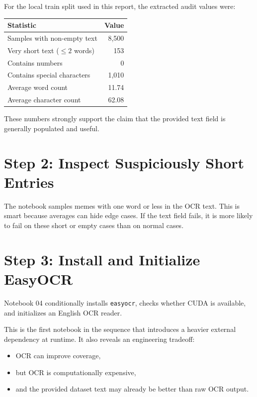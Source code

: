 \documentclass[11pt,a4paper]{report}
\begin{document}
For the local train split used in this report, the extracted audit values were:

\begin{center}
\begin{tabular}{lr}
\toprule
Statistic & Value \\
\midrule
Samples with non-empty text & 8,500 \\
Very short text ($\leq 2$ words) & 153 \\
Contains numbers & 0 \\
Contains special characters & 1,010 \\
Average word count & 11.74 \\
Average character count & 62.08 \\
\bottomrule
\end{tabular}
\end{center}

These numbers strongly support the claim that the provided text field is generally populated and useful.

\section{Step 2: Inspect Suspiciously Short Entries}

The notebook samples memes with one word or less in the OCR text. This is smart because averages can hide edge cases. If the text field fails, it is more likely to fail on these short or empty cases than on normal cases.

\section{Step 3: Install and Initialize EasyOCR}

Notebook 04 conditionally installs \texttt{easyocr}, checks whether CUDA is available, and initializes an English OCR reader.

This is the first notebook in the sequence that introduces a heavier external dependency at runtime. It also reveals an engineering tradeoff:

\begin{itemize}
\item OCR can improve coverage,
\item but OCR is computationally expensive,
\item and the provided dataset text may already be better than raw OCR output.
\end{itemize}
\end{document}
